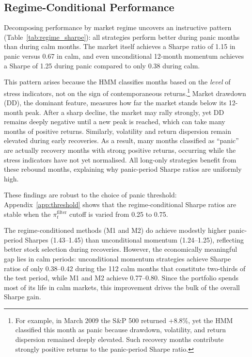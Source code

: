\subsection{Regime-Conditional Performance}\label{sec:regime_results}

Decomposing performance by market regime uncovers an instructive pattern (Table~\ref{tab:regime_sharpe}): all strategies perform better during panic months than during calm months. The market itself achieves a Sharpe ratio of 1.15 in panic versus 0.67 in calm, and even unconditional 12-month momentum achieves a Sharpe of 1.25 during panic compared to only 0.38 during calm.



This pattern arises because the HMM classifies months based on the \emph{level} of stress indicators, not on the sign of contemporaneous returns.\footnote{For example, in March 2009 the S\&P 500 returned +8.8\%, yet the HMM classified this month as panic because drawdown, volatility, and return dispersion remained deeply elevated. Such recovery months contribute strongly positive returns to the panic-period Sharpe ratio.} Market drawdown (DD), the dominant feature, measures how far the market stands below its 12-month peak. After a sharp decline, the market may rally strongly, yet DD remains deeply negative until a new peak is reached, which can take many months of positive returns. Similarly, volatility and return dispersion remain elevated during early recoveries. As a result, many months classified as ``panic'' are actually recovery months with strong positive returns, occurring while the stress indicators have not yet normalised. All long-only strategies benefit from these rebound months, explaining why panic-period Sharpe ratios are uniformly high.

These findings are robust to the choice of panic threshold: Appendix~\ref{app:threshold} shows that the regime-conditional Sharpe ratios are stable when the $\pi_t^{\text{filter}}$ cutoff is varied from 0.25 to 0.75.

The regime-conditioned methods (M1 and M2) do achieve modestly higher panic-period Sharpes (1.43--1.45) than unconditional momentum (1.24--1.25), reflecting better stock selection during recoveries. However, the economically meaningful gap lies in calm periods: unconditional momentum strategies achieve Sharpe ratios of only 0.38--0.42 during the 112 calm months that constitute two-thirds of the test period, while M1 and M2 achieve 0.77--0.80. Since the portfolio spends most of its life in calm markets, this improvement drives the bulk of the overall Sharpe gain.


